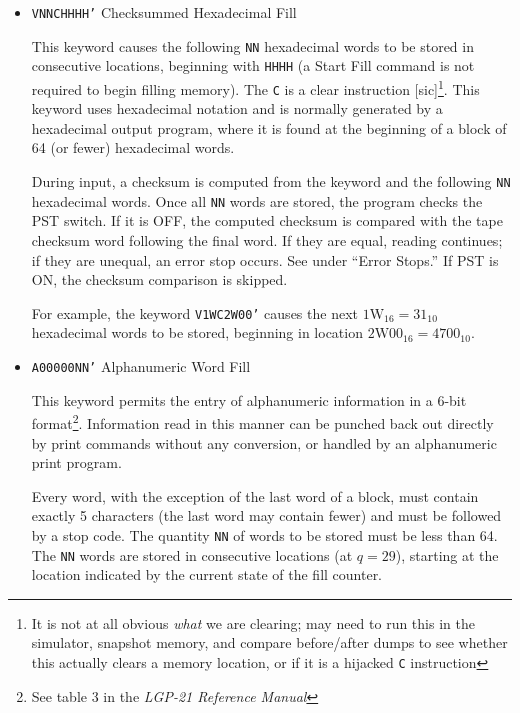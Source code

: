 \begin{itemize}
\noindent A hexadecimal word may contain a maximum of eight characters. Any combination of the characters $0,1,\dots,9$ and \texttt{F,G,J,K,Q,W} may be used; \texttt{00000000} is the smallest value and \texttt{WWWWWWWW} is the largest value the computer can accept. If a word is zero, only a stop code is required. Leading zeros may be omitted; every word must be followed by a stop code.

\item \texttt{VNNCHHHH'} Checksummed Hexadecimal Fill

This keyword causes the following \texttt{NN} hexadecimal words to be stored in consecutive locations, beginning with \texttt{HHHH} (a Start Fill command is not required to begin filling memory). The \texttt{C} is a clear instruction [sic]\footnote{It is not at all obvious \emph{what} we are clearing; may need to run this in the simulator, snapshot memory, and compare before/after dumps to see whether this actually clears a memory location, or if it is a hijacked \texttt{C} instruction}. This keyword uses hexadecimal notation and is normally generated by a hexadecimal output program, where it is found at the beginning of a block of 64 (or fewer) hexadecimal words.

During input, a checksum is computed from the keyword and the following \texttt{NN} hexadecimal words. Once all \texttt{NN} words are stored, the program checks the \textsf{PST} switch. If it is \textsf{OFF}, the computed checksum is compared with the tape checksum word following the final word. If they are equal, reading continues; if they are unequal, an error stop occurs. See under ``Error Stops.'' If \textsf{PST} is \textsf{ON}, the checksum comparison is skipped.

For example, the keyword \texttt{V1WC2W00'} causes the next $1\text{W}_{16} = 31_{10}$ hexadecimal words to be stored, beginning in location $2\text{W}00_{16} = 4700_{10}$.

\item \texttt{A00000NN'} Alphanumeric Word Fill

This keyword permits the entry of alphanumeric information in a 6-bit format\footnote{See table 3 in the \textit{LGP-21 Reference Manual}\cite{lgp21referencemanual}}. Information read in this manner can be punched back out directly by print commands without any conversion, or handled by an alphanumeric print program.

Every word, with the exception of the last word of a block, must contain exactly 5 characters (the last word may contain fewer) and must be followed by a stop code. The quantity \texttt{NN} of words to be stored must be less than 64. The \texttt{NN} words are stored in consecutive locations (at $q=29$), starting at the location indicated by the current state of the fill counter.


\end{itemize}

